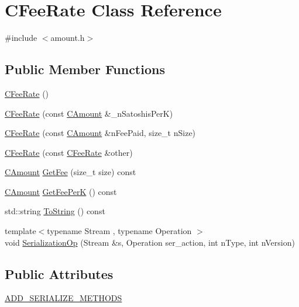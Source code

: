 \hypertarget{class_c_fee_rate}{}\section{C\+Fee\+Rate Class Reference}
\label{class_c_fee_rate}


{\ttfamily \#include $<$amount.\+h$>$}

\subsection*{Public Member Functions}
\begin{DoxyCompactItemize}
\item 
\mbox{\hyperlink{class_c_fee_rate_aed181aa12213c646c8a4632280444412}{C\+Fee\+Rate}} ()
\item 
\mbox{\hyperlink{class_c_fee_rate_abee4364fc0d83612feda7c9f5425a7cc}{C\+Fee\+Rate}} (const \mbox{\hyperlink{amount_8h_a4eaf3a5239714d8c45b851527f7cb564}{C\+Amount}} \&\+\_\+n\+Satoshis\+PerK)
\item 
\mbox{\hyperlink{class_c_fee_rate_ad92ea084b8fa9495cbfe0da9cfd1cd69}{C\+Fee\+Rate}} (const \mbox{\hyperlink{amount_8h_a4eaf3a5239714d8c45b851527f7cb564}{C\+Amount}} \&n\+Fee\+Paid, size\+\_\+t n\+Size)
\item 
\mbox{\hyperlink{class_c_fee_rate_aa82ca8ba290a1c02ed522aacfb5105ef}{C\+Fee\+Rate}} (const \mbox{\hyperlink{class_c_fee_rate}{C\+Fee\+Rate}} \&other)
\item 
\mbox{\hyperlink{amount_8h_a4eaf3a5239714d8c45b851527f7cb564}{C\+Amount}} \mbox{\hyperlink{class_c_fee_rate_a6a3aef64120ef51ac921318282404b0e}{Get\+Fee}} (size\+\_\+t size) const
\item 
\mbox{\hyperlink{amount_8h_a4eaf3a5239714d8c45b851527f7cb564}{C\+Amount}} \mbox{\hyperlink{class_c_fee_rate_ac772be79983433d442d6b871d2fb6e11}{Get\+Fee\+PerK}} () const
\item 
std\+::string \mbox{\hyperlink{class_c_fee_rate_a67a2711583d588edd3dfa2dba682f4ce}{To\+String}} () const
\item 
{\footnotesize template$<$typename Stream , typename Operation $>$ }\\void \mbox{\hyperlink{class_c_fee_rate_aface850a2c1af316cedf87d24f04fda3}{Serialization\+Op}} (Stream \&s, Operation ser\+\_\+action, int n\+Type, int n\+Version)
\end{DoxyCompactItemize}
\subsection*{Public Attributes}
\begin{DoxyCompactItemize}
\item 
\mbox{\hyperlink{class_c_fee_rate_ab1030f8a059eb5ccade1e3803bd727b3}{A\+D\+D\+\_\+\+S\+E\+R\+I\+A\+L\+I\+Z\+E\+\_\+\+M\+E\+T\+H\+O\+DS}}
\end{DoxyCompactItemize}
